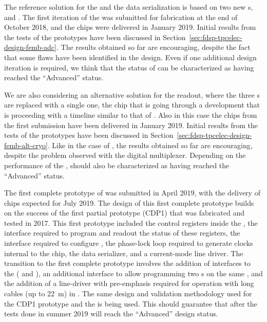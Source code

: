 The reference solution for the  and the data serialization is based on two new 
s,  and .
The first iteration of the  was submitted for fabrication
at the end of October 2018, and the chips were delivered in January 2019.
Initial results from the tests of the  prototypes have
been discussed in Section~\ref{sec:fdsp-tpcelec-design-femb-adc}. The
results obtained so far are encouraging, despite the fact that some
flaws have been identified in the design. Even if one additional design
iteration is required, we think that the status of  can
be characterized as having reached the ``Advanced'' status.

We are also considering an alternative solution for the readout, where
the three s are replaced with a single one, the 
chip that is going through a development that is proceeding with a 
timeline similar to that of . Also in this case the
chips from the first submission have been delivered in January 2019.
Initial results from the tests of the  prototypes have
been discussed in Section~\ref{sec:fdsp-tpcelec-design-femb-alt-cryo}.
Like in the case of , the results obtained so far are
encouraging, despite the problem observed with the digital multiplexer.
Depending on the performance of the ,  should
also be characterized as having reached the ``Advanced'' status.

The first complete prototype of  was submitted in 
April 2019, with the delivery of chips expected for July 2019.
The design of this first complete prototype builds on the success of
the first partial prototype (CDP1) that was fabricated and tested in 2017.
This first prototype included the control registers inside the 
, the  interface required to program and readout
the status of these registers, the  interface required to
configure , the phase-lock loop required to generate
clocks internal to the chip, the data serializer, and a current-mode
line driver. The transition to the first complete prototype
involves the addition of interfaces to the  (
and ), an additional  interface to allow programming two
 s on the same , and the
addition of a line-driver with pre-emphasis required for operation
with long cables (up to \SI{22}{m}) in \lar. The same design and
validation methodology used for the CDP1 prototype and the 
is being used. This should guarantee that after the tests done in
summer 2019  will reach the ``Advanced'' design 
status. 

